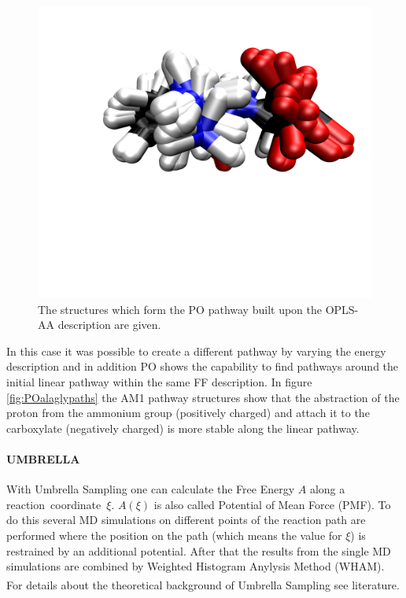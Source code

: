 \documentclass[a4paper,11pt]{scrartcl}
\newcommand{\myCite}[1]{\textsuperscript{\cite{#1}}}
\begin{document}
\begin{figure}[H]
		\center
		\includegraphics[scale=0.1]{Pathopt/PO_gly_ala_1.png}\caption{The structures which form the PO pathway built upon the OPLS-AA description are given.}
\label{fig:POalaglystrucpo}
\end{figure}
In this case it was possible to create a different pathway by varying the energy description and in addition PO shows the capability to find pathways around the initial linear pathway within the same FF description. In figure \ref{fig:POalaglypaths} the AM1 pathway structures show that the abstraction of the proton from the ammonium group (positively charged) and attach it to the carboxylate (negatively charged) is more stable along the linear pathway. 

\paragraph{UMBRELLA}

With Umbrella Sampling one can calculate the Free Energy $A$ along a \mbox{reaction coordinate $\xi$.} $A(\xi)$ is also called Potential of Mean Force (PMF). To do this several MD simulations on different points of the reaction path are performed where the position on the path (which means the value for $\xi$) is restrained by an additional potential. After that the results from the single MD simulations are combined by Weighted Histogram Anylysis Method (WHAM). For details about the theoretical background of Umbrella Sampling see literature.\myCite{kastner_umbrella_2011}\myCite{souaille_extension_2001}
\end{document}
